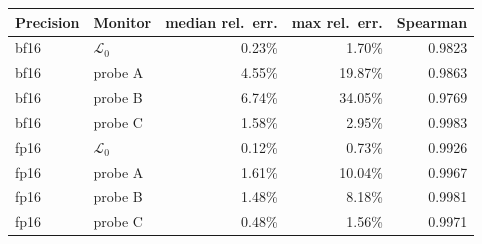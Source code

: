 \begin{tabular}{llrrr}
\toprule
Precision & Monitor & median rel.\ err. & max rel.\ err. & Spearman \\
\midrule
bf16 & $\mathcal{L}_0$ & 0.23\% & 1.70\% & 0.9823 \\
bf16 & probe A & 4.55\% & 19.87\% & 0.9863 \\
bf16 & probe B & 6.74\% & 34.05\% & 0.9769 \\
bf16 & probe C & 1.58\% & 2.95\% & 0.9983 \\
\midrule
fp16 & $\mathcal{L}_0$ & 0.12\% & 0.73\% & 0.9926 \\
fp16 & probe A & 1.61\% & 10.04\% & 0.9967 \\
fp16 & probe B & 1.48\% & 8.18\% & 0.9981 \\
fp16 & probe C & 0.48\% & 1.56\% & 0.9971 \\
\bottomrule
\end{tabular}
